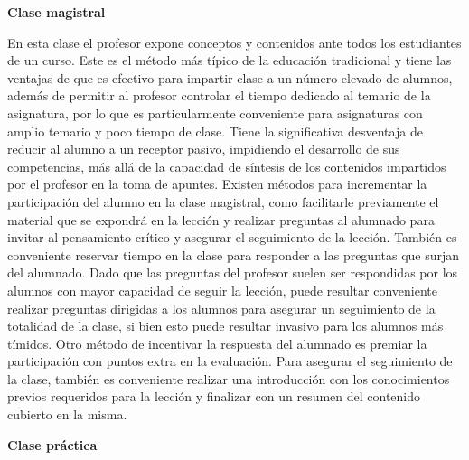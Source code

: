 \documentclass[a4paper,12pt,twoside]{article}
\begin{document}
\textbf{Clase magistral} 

En esta clase el profesor expone conceptos y contenidos ante todos los estudiantes de un curso. Este es el método más típico de la educación tradicional y tiene las ventajas de que es efectivo para impartir clase a un número elevado de alumnos, además de permitir al profesor controlar el tiempo dedicado al temario de la asignatura, por lo que es particularmente conveniente para asignaturas con amplio temario y poco tiempo de clase. Tiene la significativa desventaja de reducir al alumno a un receptor pasivo, impidiendo el desarrollo de sus competencias, más allá de la capacidad de síntesis de los contenidos impartidos por el profesor en la toma de apuntes. Existen métodos para incrementar la participación del alumno en la clase magistral, como facilitarle previamente el material que se expondrá en la lección y realizar preguntas al alumnado para invitar al pensamiento crítico y asegurar el seguimiento de la lección. También es conveniente reservar tiempo en la clase para responder a las preguntas que surjan del alumnado. Dado que las preguntas del profesor suelen ser respondidas por los alumnos con mayor capacidad de seguir la lección, puede resultar conveniente realizar preguntas dirigidas a los alumnos para asegurar un seguimiento de la totalidad de la clase, si bien esto puede resultar invasivo para los alumnos más tímidos. Otro método de incentivar la respuesta del alumnado es premiar la participación con puntos extra en la evaluación. Para asegurar el seguimiento de la clase, también es conveniente realizar una introducción con los conocimientos previos requeridos para la lección y finalizar con un resumen del contenido cubierto en la misma.

\textbf{Clase práctica} 
\end{document}
